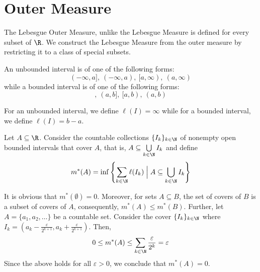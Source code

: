 \section{Outer Measure}

The Lebesgue Outer Measure, unlike the Lebesgue Measure is defined for every subset of $\R$. We construct the Lebesgue Measure from the outer measure by restricting it to a class of special subsets.

\begin{definition}[Interval]
    An unbounded interval is of one of the following forms: 
    \begin{equation*}
        (-\infty, a],~(-\infty, a),~[a,\infty),~(a,\infty)
    \end{equation*}
    while a bounded interval is of one of the following forms: 
    \begin{equation*}
        [a,b],~(a,b],~[a,b),~(a,b)
    \end{equation*}

    For an unbounded interval, we define $\ell(I) = \infty$ while for a bounded interval, we define $\ell(I) = b - a$.
\end{definition}

\begin{definition}
    Let $A\subseteq\R$. Consider the countable collections $\{I_k\}_{k\in\N}$ of nonempty open bounded intervals that cover $A$, that is, $A\subseteq\bigcup\limits_{k\in\N} I_k$ and define 
    \begin{equation*}
        m^*(A) = \inf\left\{\sum_{k\in\N}\ell(I_k)\Bigm\vert A\subseteq\bigcup_{k\in\N} I_k\right\}
    \end{equation*}
\end{definition}

It is obvious that $m^*(\emptyset) = 0$. Moreover, for sets $A\subseteq B$, the set of covers of $B$ is a subset of covers of $A$, consequently, $m^*(A)\le m^*(B)$. Further, let $A = \{a_1,a_2,\ldots\}$ be a countable set. Consider the cover $\{I_k\}_{k\in\N}$ where $I_k = \left(a_k - \frac{\varepsilon}{2^{k + 1}}, a_k + \frac{\varepsilon}{2^{k + 1}}\right)$. Then, 
\begin{equation*}
    0\le m^*(A)\le\sum_{k\in\N}\frac{\varepsilon}{2^k} = \varepsilon
\end{equation*}
Since the above holds for all $\varepsilon > 0$, we conclude that $m^*(A) = 0$.

